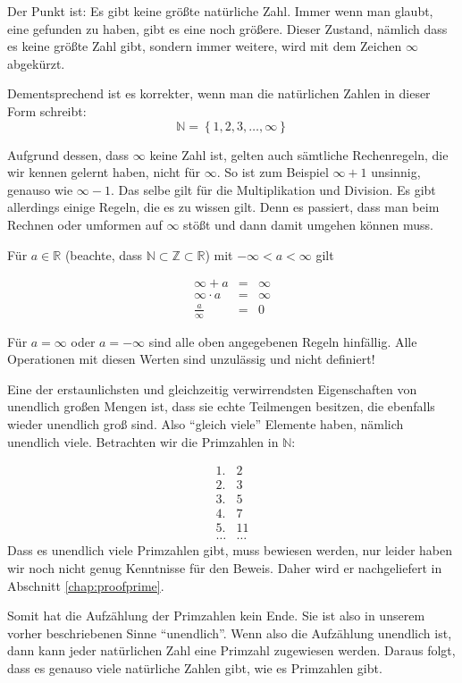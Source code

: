 Der Punkt ist: Es gibt keine größte natürliche Zahl. Immer wenn man glaubt, eine gefunden zu haben, gibt es eine noch größere. Dieser Zustand, nämlich dass es keine größte Zahl gibt, sondern immer weitere, wird mit dem Zeichen $\infty$ abgekürzt. 

Dementsprechend ist es korrekter, wenn man die natürlichen Zahlen in dieser Form schreibt:
\[
\mathbb{N} = \left\lbrace 1,2,3, \dots, \infty \right\rbrace
\]

Aufgrund dessen, dass $\infty$ keine Zahl ist, gelten auch sämtliche Rechenregeln, die wir kennen gelernt haben, nicht für $\infty$. So ist zum Beispiel $\infty +1$ unsinnig, genauso wie $\infty-1$. Das selbe gilt für die Multiplikation und Division. Es gibt allerdings einige Regeln, die es zu wissen gilt. Denn es passiert, dass man beim Rechnen oder umformen auf $\infty$ stößt und dann damit umgehen können muss. 

Für $a\in \mathbb{R}$ (beachte, dass $\mathbb{N} \subset \mathbb{Z} \subset \mathbb{R}$) mit $-\infty < a < \infty$ gilt

\begin{eqnarray*}
\infty + a &=& \infty \\
\infty \cdot a &=& \infty \\
\frac{a}{\infty} &=& 0
\end{eqnarray*}

Für $a=\infty$ oder $a=-\infty$ sind alle oben angegebenen Regeln hinfällig. Alle Operationen mit diesen Werten sind unzulässig und nicht definiert!

Eine der erstaunlichsten und gleichzeitig verwirrendsten Eigenschaften von unendlich großen Mengen ist, dass sie echte Teilmengen besitzen, die ebenfalls wieder unendlich groß sind. Also "`gleich viele"' Elemente haben, nämlich unendlich viele. Betrachten wir die Primzahlen in $\mathbb{N}$:

\begin{eqnarray*}
1. & 2 \\
2. & 3 \\
3. & 5 \\
4. & 7 \\
5. & 11 \\
\dots & \dots
\end{eqnarray*}
Dass es unendlich viele Primzahlen gibt, muss bewiesen werden, nur leider haben wir noch nicht genug Kenntnisse für den Beweis. Daher wird er nachgeliefert in Abschnitt \ref{chap:proofprime}. 

Somit hat die Aufzählung der Primzahlen kein Ende. Sie ist also in unserem vorher beschriebenen Sinne "`unendlich"'. Wenn also die Aufzählung unendlich ist, dann kann jeder natürlichen Zahl eine Primzahl zugewiesen werden. Daraus folgt, dass es genauso viele natürliche Zahlen gibt, wie es Primzahlen gibt. 

